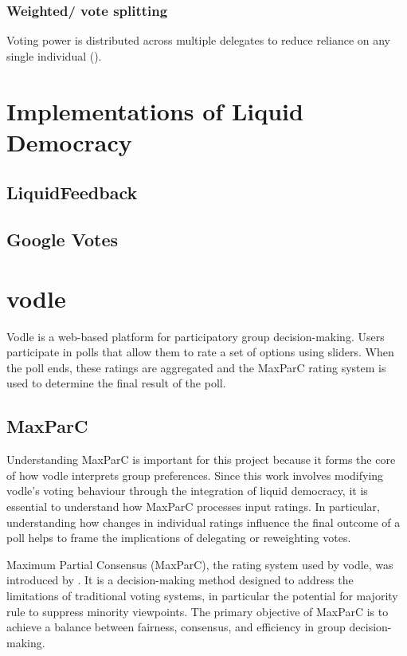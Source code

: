 \subsubsection{Weighted/ vote splitting}
Voting power is distributed across multiple delegates to reduce reliance on any single individual (\cite{golz_fluid_2021}).

\section{Implementations of Liquid Democracy}
\subsection{LiquidFeedback}
\subsection{Google Votes}

\section{vodle}
Vodle is a web-based platform for participatory group decision-making. Users participate in polls that allow them to rate a set of options using sliders. When the poll ends, these ratings are aggregated and the MaxParC rating system is used to determine the final result of the poll.

\subsection{MaxParC}
Understanding MaxParC is important for this project because it forms the core of how vodle interprets group preferences. Since this work involves modifying vodle's voting behaviour through the integration of liquid democracy, it is essential to understand how MaxParC processes input ratings. In particular, understanding how changes in individual ratings influence the final outcome of a poll helps to frame the implications of delegating or reweighting votes.

Maximum Partial Consensus (MaxParC), the rating system used by vodle, was introduced by \cite{heitzig_fair_2024}. It is a decision-making method designed to address the limitations of traditional voting systems, in particular the potential for majority rule to suppress minority viewpoints.
The primary objective of MaxParC is to achieve a balance between fairness, consensus, and efficiency in group decision-making.

